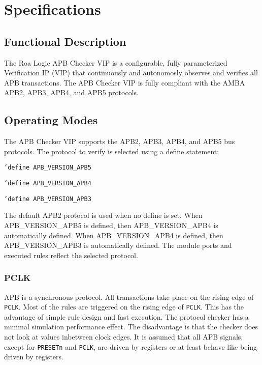 \chapter{Specifications} \label{specifications}

\section{Functional Description}\label{functional-description}

The Roa Logic APB Checker VIP is a configurable, fully parameterized Verification IP (VIP)
that continuously and autonomosly observes and verifies all APB transactions.
The APB Checker VIP is fully compliant with the AMBA APB2, APB3, APB4, and APB5 protocols.


\section{Operating Modes}\label{operating-modes}

The APB Checker VIP supports the APB2, APB3, APB4, and APB5 bus protocols. The protocol to verify is selected using a define statement;

\texttt{`define APB\_VERSION\_APB5}

\texttt{`define APB\_VERSION\_APB4}

\texttt{`define APB\_VERSION\_APB3}

The default APB2 protocol is used when no define is set. When APB\_VERSION\_APB5 is defined, then APB\_VERSION\_APB4 is automatically defined. When APB\_VERSION\_APB4 is defined, then APB\_VERSION\_APB3 is automatically defined.
The module ports and executed rules reflect the selected protocol.
 

\subsection{PCLK}\label{PCLK}
APB is a synchronous protocol. All transactions take place on the rising edge of \texttt{PCLK}.
Most of the rules are triggered on the rising edge of \texttt{PCLK}. This has the advantage of simple rule design and fast execution. The protocol checker has a minimal simulation performance effect. The disadvantage is that the checker does not look at values inbetween clock edges. It is assumed that all APB signals, except for \texttt{PRESETn} and \texttt{PCLK}, are driven by registers or at least behave like being driven by registers.
